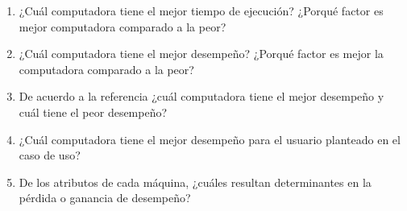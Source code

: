 \documentclass{article}
\begin{document}
    \begin{enumerate}
        \item {
            ¿Cuál computadora tiene el mejor tiempo de ejecución? ¿Porqué 
        factor es mejor computadora comparado a la peor?
        }
        \item {
            ¿Cuál computadora tiene el mejor desempeño? ¿Porqué 
        factor es mejor la computadora comparado a la peor?
        }
        \item {
            De acuerdo a la referencia ¿cuál computadora tiene el mejor desempeño
            y cuál tiene el peor desempeño?
        }
        \item {
            ¿Cuál computadora tiene el mejor desempeño para el usuario planteado
            en el caso de uso?
        }
        \item {
            De los atributos de cada máquina, ¿cuáles resultan determinantes en 
            la pérdida o ganancia de desempeño?
        }
    \end{enumerate}
\end{document}
